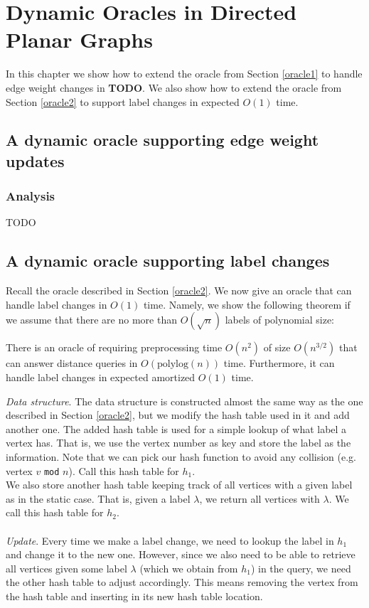 \section{Dynamic Oracles in Directed Planar Graphs}\label{dynamicPlanar}
In this chapter we show how to extend the oracle from Section \ref{oracle1} to handle
edge weight changes in \textbf{TODO}. We also show how to extend the oracle from Section
\ref{oracle2} to support label changes in expected $O(1)$ time.

\subsection{A dynamic oracle supporting edge weight updates}\label{oracle3}


\subsubsection{Analysis}
TODO

\subsection{A dynamic oracle supporting label changes}\label{oracle4}
Recall the oracle described in Section \ref{oracle2}. We now give an oracle that can
handle label changes in $O(1)$ time. Namely, we show the following theorem if we assume
that there are no more than $O(\sqrt{n})$ labels of polynomial size:
\begin{thm}\label{thm3}
  There is an oracle of requiring preprocessing time $O(n^2)$ of size $O(n^{3/2})$ that
  can answer distance queries in $O(\text{polylog}(n))$ time. Furthermore, it can handle
  label changes in expected amortized $O(1)$ time.
\end{thm}
\textit{Data structure}.
The data structure is constructed almost the same way as the one described in Section
\ref{oracle2}, but we modify the hash table used in it and add another one. The added
hash table is used for a simple lookup of what label a vertex has. That is, we use the
vertex number as key and store the label as the information. Note that we can pick our
hash function to avoid any collision (e.g. vertex $v$ \texttt{mod} $n$). Call this hash
table for $h_1$. \\
We also store another hash table keeping track of all vertices with a given label as in
the static case. That is, given a label $\lambda$, we return all vertices with $\lambda$.
We call this hash table for $h_2$. \\
\\
\indent\textit{Update}.
Every time we make a label change, we need to lookup the label in $h_1$ and change
it to the new one. However, since we also need to be able to retrieve all vertices given some label
$\lambda$ (which we obtain from $h_1$) in the query, we need the other hash table to adjust accordingly. This means
removing the vertex from the hash table and inserting in its new hash table location.

